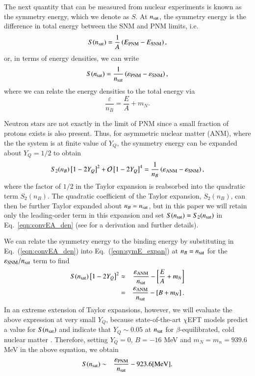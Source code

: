\documentclass[aps,prd,nofootinbib,tightenlines,notitlepage,floatfix,superscriptaddress,showkeys,twocolumn]{revtex4-1}
\newcommand{\CEFT}{$\chi$EFT }
\begin{document}
The next quantity that can be measured from nuclear experiments is known as the symmetry energy, which we denote as $S$. At $n_{\rm sat}$, the symmetry energy is the difference in total energy between the SNM and PNM limits, i.e.
\begin{equation}
    S(n_{\rm sat})=\frac{1}{A}\left(E_{\rm PNM}-E_{\rm SNM}\right),
\end{equation}
or, in terms of energy densities, we can write
\begin{equation}\label{eqn:PNM_Esym}
    S(n_{\rm sat})=\frac{1}{n_{\rm sat}}\left(\varepsilon_{\rm PNM}-\varepsilon_{\rm SNM}\right),
\end{equation}
where we can relate the energy densities to the total energy via
\begin{equation}\label{eqn:convEA_den}
    \frac{\varepsilon}{n_B}=\frac{E}{A}+m_{N}.
\end{equation}

Neutron stars are not exactly in the limit of PNM since a small fraction of protons exists is also present.  Thus, for asymmetric nuclear matter (ANM), where the the system is at finite value of $Y_Q$, the symmetry energy can be expanded about $Y_Q = 1/2$ to obtain
\begin{equation}\label{eqn:symE_expan}
    S_2(n_{B})\left[1-2Y_Q\right]^2+\mathcal{O}\left[1-2Y_Q\right]^4=\frac{1}{n_{B}}\left(\varepsilon_{\rm ANM}-\varepsilon_{\rm SNM}\right),
\end{equation}
where the factor of $1/2$ in the Taylor expansion is reabsorbed into the quadratic term $S_2(n_B)$. 
The quadratic coefficient of the Taylor expansion, $S_2(n_B)$, can then be further Taylor expanded about $n_B = n_{\rm sat}$, but in this paper we will retain only the leading-order term in this expansion and set $S(n_{\rm sat}) = S_2(n_{\rm sat})$ in Eq.~\eqref{eqn:convEA_den} (see \cite{Li:2019xxz} for a derivation and further details). 

We can relate the symmetry energy to the binding energy by substituting in Eq.\ (\ref{eqn:convEA_den}) into Eq.\ (\ref{eqn:symE_expan}) at $n_B= n_{\rm sat}$ for the $\varepsilon_{\rm SNM}/n_{\rm sat}$ term to find
\begin{eqnarray}
    S(n_{\rm sat})\left[1-2Y_Q\right]^2&\approx&\frac{\varepsilon_{\rm ANM}}{n_{\rm sat}}-\left[\frac{E}{A}+m_{N}\right]\\
    &=&\frac{\varepsilon_{\rm ANM}}{n_{\rm sat}}-\left[B+m_{N}\right].
\end{eqnarray}
In an extreme extension of Taylor expansions, however, we will evaluate the above expression at very small $Y_Q$, because state-of-the-art \CEFT models predict a value for $S(n_{\rm sat})$ and indicate that $Y_Q\sim 0.05$ at $n_{\rm sat}$ for $\beta$-equilibrated, cold nuclear matter \cite{Drischler:2020fvz}. Therefore, setting $Y_Q = 0$, $B=-16$ MeV and $m_N = m_n= 939.6$ MeV in the above equation, we obtain
\begin{eqnarray}\label{eq:Esym}
    S(n_{\rm sat})&\sim&\frac{\varepsilon_{\rm PNM}}{n_{\rm sat}}-923.6 \mathrm{ [MeV]}.
\end{eqnarray}
\end{document}
